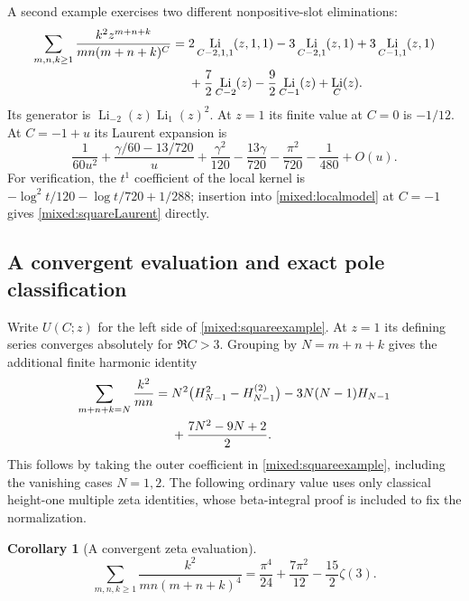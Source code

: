 \documentclass[11pt]{article}
\numberwithin{equation}{section}
\theoremstyle{plain}
\newtheorem{corollary}[theorem]{Corollary}
\theoremstyle{definition}
\theoremstyle{remark}
\DeclareMathOperator{\Li}{Li}
\begin{document}
A second example exercises two different nonpositive-slot eliminations:
\begin{align}\label{mixed:squareexample}
 \sum_{m,n,k\ge1}\frac{k^2z^{m+n+k}}{mn(m+n+k)^C}
 ={}&2\Li_{C-2,1,1}(z,1,1)
       -3\Li_{C-2,1}(z,1)+3\Li_{C-1,1}(z,1)\notag\\
 &+\frac72\Li_{C-2}(z)-\frac92\Li_{C-1}(z)+\Li_C(z).
\end{align}
Its generator is $\Li_{-2}(z)\Li_1(z)^2$. At $z=1$ its finite
value at $C=0$ is $-1/12$. At $C=-1+u$ its Laurent expansion is
\begin{equation}\label{mixed:squareLaurent}
 \frac1{60u^2}+\frac{\gamma/60-13/720}{u}
   +\frac{\gamma^2}{120}-\frac{13\gamma}{720}
    -\frac{\pi^2}{720}-\frac1{480}+O(u).
\end{equation}
For verification, the $t^1$ coefficient of the local kernel is
$-\log^2t/120-\log t/720+1/288$; insertion into
\eqref{mixed:localmodel} at $C=-1$ gives
\eqref{mixed:squareLaurent} directly.

\subsection{A convergent evaluation and exact pole classification}

Write $U(C;z)$ for the left side of \eqref{mixed:squareexample}.
At $z=1$ its defining series converges absolutely for $\Re C>3$.
Grouping by $N=m+n+k$ gives the additional finite harmonic identity
\begin{align}\label{mixed:Ucoeff}
 \sum_{m+n+k=N}\frac{k^2}{mn}
 ={}&N^2\bigl(H_{N-1}^2-H_{N-1}^{(2)}\bigr)
        -3N(N-1)H_{N-1}\notag\\
 &+\frac{7N^2-9N+2}{2}.
\end{align}
This follows by taking the outer coefficient in
\eqref{mixed:squareexample}, including the vanishing cases $N=1,2$.
The following ordinary value uses only classical height-one multiple
zeta identities, whose beta-integral proof is included to fix the
normalization.

\begin{corollary}[A convergent zeta evaluation]
\label{mxex:weight-four}
\begin{equation}
 \boxed{\displaystyle
 \sum_{m,n,k\geq1}\frac{k^2}{mn(m+n+k)^4}
   =\frac{\pi^4}{24}+\frac{7\pi^2}{12}
      -\frac{15}{2}\zeta(3).}
 \label{mxex:convergent-value}
\end{equation}
\end{corollary}
\end{document}
